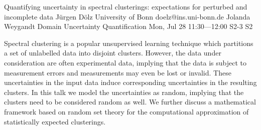 \begin{talk}
\end{talk}

\begin{talk}
  {Quantifying uncertainty in spectral clusterings: expectations for perturbed and incomplete data}%
  {J\"urgen D\"olz}%
  {University of Bonn}%
  {doelz@ins.uni-bonn.de}%
  {Jolanda Weygandt}%
  {Domain Uncertainty Quantification}%
  {Mon, Jul 28 11:30---12:00}%
  {S2-3}%
  {S2}%
    
   
Spectral clustering is a popular unsupervised learning technique which partitions a set of unlabelled data into disjoint clusters. However, the data under consideration are often experimental data, implying that the data is subject to measurement errors and measurements may even be lost or invalid. These uncertainties in the input data induce corresponding uncertainties in the resulting clusters. In this talk we model the uncertainties as random, implying that the clusters need to be considered random as well. We further discuss a mathematical framework based on random set theory for the computational approximation of statistically expected clusterings.
\end{talk}


